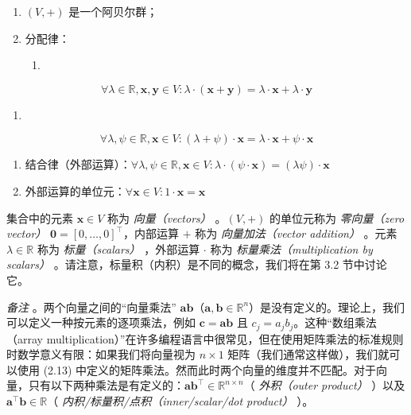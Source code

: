 \begin{enumerate}
\item $ (V, +) $ 是一个阿贝尔群；
\item 分配律：
\begin{enumerate}
\item 
\end{enumerate}
\end{enumerate}
\begin{equation*}
\forall \lambda \in \mathbb{R}, \boldsymbol{x}, \boldsymbol{y} \in V : \lambda \cdot (\boldsymbol{x} + \boldsymbol{y}) = \lambda \cdot \boldsymbol{x} + \lambda \cdot \boldsymbol{y}
\end{equation*}
\begin{enumerate}
\begin{enumerate}
\item 
\end{enumerate}
\end{enumerate}
\begin{equation*}
\forall \lambda, \psi \in \mathbb{R}, \boldsymbol{x} \in V : (\lambda + \psi) \cdot \boldsymbol{x} = \lambda \cdot \boldsymbol{x} + \psi \cdot \boldsymbol{x}
\end{equation*}
\begin{enumerate}
\item 结合律（外部运算）：$ \forall \lambda, \psi \in \mathbb{R}, \boldsymbol{x} \in V : \lambda \cdot (\psi \cdot \boldsymbol{x}) = (\lambda \psi) \cdot \boldsymbol{x} $
\item 外部运算的单位元：$ \forall \boldsymbol{x} \in V : 1 \cdot \boldsymbol{x} = \boldsymbol{x} $
\end{enumerate}

集合中的元素 $ \boldsymbol{x} \in V $ 称为 \emph{向量（vectors）} 。$ (V, +) $ 的单位元称为 \emph{零向量（zero vector）} $ \boldsymbol{0} = [0, \ldots, 0]^\top $，内部运算 $ + $ 称为 \emph{向量加法（vector addition）} 。元素 $ \lambda \in \mathbb{R} $ 称为 \emph{标量（scalars）} ，外部运算 $ \cdot $ 称为 \emph{标量乘法（multiplication by scalars）} 。请注意，标量积（内积）是不同的概念，我们将在第 3.2 节中讨论它。

\emph{备注} 。两个向量之间的“向量乘法” $ \boldsymbol{a} \boldsymbol{b} $（$ \boldsymbol{a}, \boldsymbol{b} \in \mathbb{R}^n $）是没有定义的。理论上，我们可以定义一种按元素的逐项乘法，例如 $ \boldsymbol{c} = \boldsymbol{a} \boldsymbol{b} $ 且 $ c_j = a_j b_j $。这种“数组乘法（array multiplication）”在许多编程语言中很常见，但在使用矩阵乘法的标准规则时数学意义有限：如果我们将向量视为 $ n \times 1 $ 矩阵（我们通常这样做），我们就可以使用 (2.13) 中定义的矩阵乘法。然而此时两个向量的维度并不匹配。对于向量，只有以下两种乘法是有定义的：$ \boldsymbol{a} \boldsymbol{b}^\top \in \mathbb{R}^{n \times n} $（ \emph{外积（outer product）} ）以及 $ \boldsymbol{a}^\top \boldsymbol{b} \in \mathbb{R} $（ \emph{内积/标量积/点积（inner/scalar/dot product）} ）。

